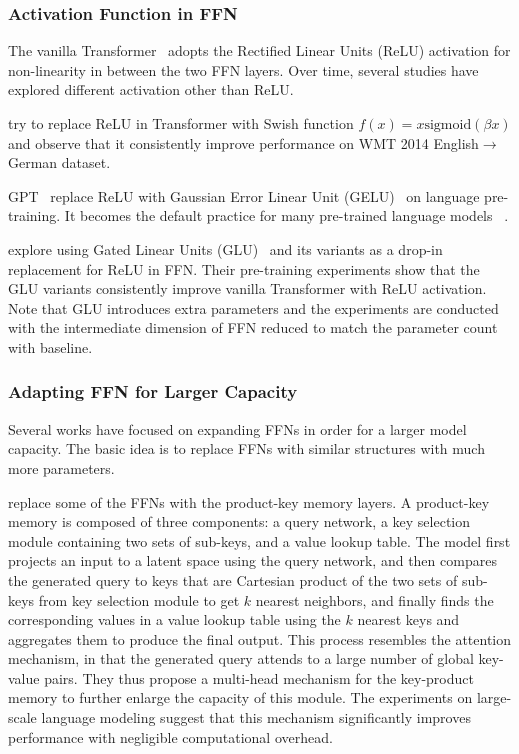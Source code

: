 \documentclass[manuscript,acmsmall,screen,nonacm]{acmart}
\theoremstyle{definition}
\begin{document}
\subsubsection{Activation Function in FFN}

The vanilla Transformer~\cite{vaswani2017attention} adopts the Rectified Linear Units (ReLU) activation for non-linearity in between the two FFN layers. Over time, several studies have explored different activation other than ReLU.

\citet{ramachandran18searching} try to replace ReLU in Transformer with Swish function $f(x)=x\mathrm{sigmoid}(\beta x)$ and observe that it consistently improve performance on WMT 2014 English$\rightarrow$German dataset.

GPT~\cite{radford2018gpt} replace ReLU with Gaussian Error Linear Unit (GELU)~\cite{hendrycks2020gelu} on language pre-training. It becomes the default practice for many pre-trained language models ~\cite{devlin2019bert,he2020deberta}.

\citet{shazeer2020glu} explore using Gated Linear Units (GLU)~\cite{dauphin17glu} and its variants as a drop-in replacement for ReLU in FFN. Their pre-training experiments show that the GLU variants consistently improve vanilla Transformer with ReLU activation. Note that GLU introduces extra parameters and the experiments are conducted with the intermediate dimension of FFN reduced to match the parameter count with baseline.

\subsubsection{Adapting FFN for Larger Capacity}

Several works have focused on expanding FFNs in order for a larger model capacity. The basic idea is to replace FFNs with similar structures with much more parameters.

\citet{lample2019large} replace some of the FFNs with the product-key memory layers. A product-key memory is composed of three components: a query network, a key selection module containing two
sets of sub-keys, and a value lookup table. The model first projects an input to a latent space using the query network, and then compares the generated query to keys that are Cartesian product of the two sets of sub-keys from key selection module to get $k$ nearest neighbors, and finally finds the corresponding values in a value lookup table using the $k$ nearest keys and aggregates them to produce the final output. This process resembles the attention mechanism, in that the generated query attends to a large number of global key-value pairs. They thus propose a multi-head mechanism for the key-product memory to further enlarge the capacity of this module. The experiments on large-scale language modeling suggest that this mechanism significantly improves performance with negligible computational overhead.
\end{document}
